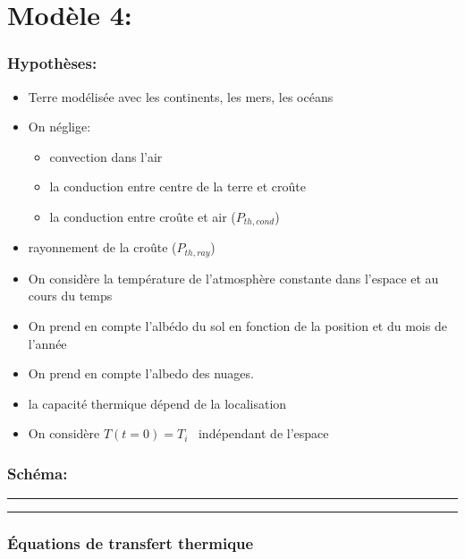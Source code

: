 \documentclass[a4paper,12pt]{article}
\begin{document}
\section*{Modèle 4: }
\subsubsection*{Hypothèses:}
\begin{itemize}
    \item Terre modélisée avec les continents, les mers, les océans 
    \item  On néglige: 
    \begin{itemize}
        \item convection dans l'air
        \item la conduction entre centre de la terre et croûte
        \item la conduction entre croûte et air (\(P_{th,cond}\))
    \end{itemize} 
    \item  rayonnement de la croûte (\(P_{th,ray}\))
    \item On considère la température de l'atmosphère constante dans l'espace et  au cours du temps 
    \item On prend en compte l'albédo du sol en fonction de la position et du mois de l'année 
    \item On prend en compte l'albedo des nuages.
    \item la capacité thermique dépend de la localisation
    \item On considère $T(t=0) = T_i$ \  indépendant de l'espace  
    
    
    
    
\end{itemize}

\subsubsection*{Schéma:} 
\noindent\textcolor{gray}{\rule{\linewidth}{0.4pt}}

    
\begin{center}
  
\end{center}
\noindent\textcolor{gray}{\rule{\linewidth}{0.4pt}}

\subsubsection*{Équations de transfert thermique}
\end{document}
